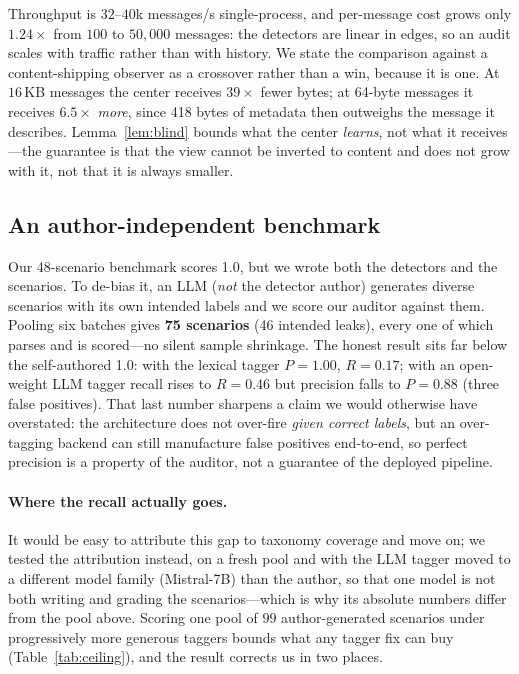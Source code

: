 \documentclass{article}
\begin{document}
Throughput is $32$--$40$k messages/s single-process, and per-message cost grows
only $1.24\times$ from $100$ to $50{,}000$ messages: the detectors are linear in
edges, so an audit scales with traffic rather than with history. We state the
comparison against a content-shipping observer as a crossover rather than a win,
because it is one. At $16$\,KB messages the center receives $39\times$ fewer bytes;
at 64-byte messages it receives $6.5\times$ \emph{more}, since 418 bytes of metadata
then outweighs the message it describes. Lemma~\ref{lem:blind} bounds what the
center \emph{learns}, not what it receives---the guarantee is that the view cannot
be inverted to content and does not grow with it, not that it is always smaller.

\subsection{An author-independent benchmark}
Our 48-scenario benchmark scores 1.0, but we wrote both the detectors and the
scenarios. To de-bias it, an LLM (\emph{not} the detector author) generates diverse
scenarios with its own intended labels and we score our auditor against them. Pooling
six batches gives \textbf{75 scenarios} (46 intended leaks), every one of which parses
and is scored---no silent sample shrinkage. The honest result sits far below the
self-authored 1.0: with the lexical tagger $P{=}1.00$, $R{=}0.17$; with an open-weight
LLM tagger recall rises to $R{=}0.46$ but precision falls to $P{=}0.88$ (three false
positives). That last number sharpens a claim we would otherwise have overstated: the
architecture does not over-fire \emph{given correct labels}, but an over-tagging
backend can still manufacture false positives end-to-end, so perfect precision is a
property of the auditor, not a guarantee of the deployed pipeline.

\paragraph{Where the recall actually goes.} It would be easy to attribute this gap
to taxonomy coverage and move on; we tested the attribution instead, on a fresh pool
and with the LLM tagger moved to a different model family (Mistral-7B) than the
author, so that one model is not both writing and grading the scenarios---which is
why its absolute numbers differ from the pool above. Scoring one
pool of $99$ author-generated scenarios under progressively more generous taggers
bounds what any tagger fix can buy (Table~\ref{tab:ceiling}), and the result
corrects us in two places.
\end{document}

